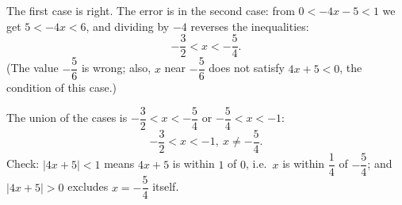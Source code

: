 The first case is right. The error is in the second case: from $0<-4x-5<1$ we get $5<-4x<6$, and dividing by $-4$ reverses the inequalities:
\[
-\dfrac{3}{2}<x<-\dfrac{5}{4} .
\]
(The value $-\dfrac{5}{6}$ is wrong; also, $x$ near $-\dfrac{5}{6}$ does not satisfy $4x+5<0$, the condition of this case.)

The union of the cases is $-\dfrac{3}{2}<x<-\dfrac{5}{4}$ or $-\dfrac{5}{4}<x<-1$:
\[
\boxed{-\dfrac{3}{2}<x<-1,\ x\ne-\dfrac{5}{4}} .
\]
Check: $|4x+5|<1$ means $4x+5$ is within $1$ of $0$, i.e.\ $x$ is within $\dfrac{1}{4}$ of $-\dfrac{5}{4}$; and $|4x+5|>0$ excludes $x=-\dfrac{5}{4}$ itself.
